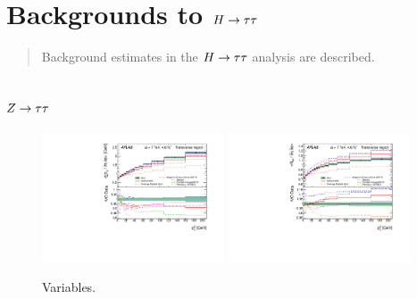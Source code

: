 \chapter[Backgrounds to $\Htautau$][Backgrounds to $\Htautau$]{Backgrounds to $\Htautau$}
\label{chap:results}

\begin{quote}
Background estimates in the $\Htautau$ analysis are described.
\end{quote}

\section{$Z\rightarrow\tau\tau$}
\label{sec:backgrounds-ztautau}

\begin{figure}[tp]
  \centering
  \includegraphics[width=0.48\textwidth]{figures/STDM-2011-42/fig_14b}
  \includegraphics[width=0.48\textwidth]{figures/STDM-2011-42/fig_17b}
  \caption{Variables.}
  \label{fig:backgrounds-zue}
\end{figure}

